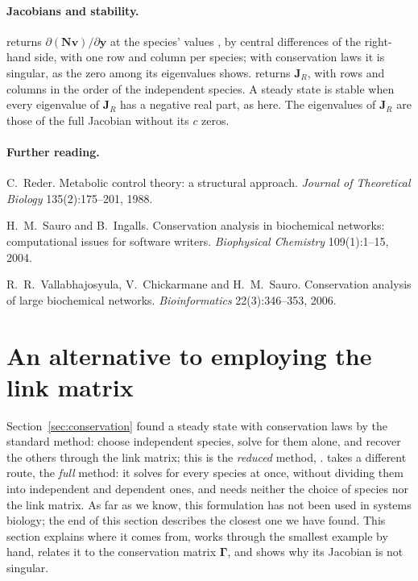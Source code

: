 \documentclass[11pt,a4paper,openany]{report}
\begin{document}
{{\paragraph{Jacobians and stability.} 
returns $\partial (\mathbf{N} \mathbf{v}) / \partial \mathbf{y}$ at the species' values , by
central differences of the right-hand side, with one row and column per
species; with conservation laws it is singular, as the zero among its
eigenvalues shows.  returns $\mathbf{J}_R$,
with rows and columns in the order of the independent species. A steady
state is stable when every eigenvalue of $\mathbf{J}_R$ has a negative real part, as
here. The eigenvalues of $\mathbf{J}_R$ are those of the full Jacobian without its
$c$ zeros.

\paragraph{Further reading.}

\begin{enumerate}[label={[\arabic*]}, ref={\arabic*}, leftmargin=2.2em]
\item\label{ref:reder} C.~Reder. Metabolic control theory: a structural
  approach. \emph{Journal of Theoretical Biology} 135(2):175--201, 1988.
\item\label{ref:sauro} H.~M.~Sauro and B.~Ingalls. Conservation analysis in
  biochemical networks: computational issues for software writers.
  \emph{Biophysical Chemistry} 109(1):1--15, 2004.
\item\label{ref:vallab} R.~R.~Vallabhajosyula, V.~Chickarmane and
  H.~M.~Sauro. Conservation analysis of large biochemical networks.
  \emph{Bioinformatics} 22(3):346--353, 2006.
\end{enumerate}

\section{An alternative to employing the link matrix}\label{sec:full}

Section~\ref{sec:conservation} found a steady state with conservation laws
by the standard method: choose independent species, solve for them alone,
and recover the others through the link matrix; this is the \emph{reduced}
method, .
 takes a different
route, the \emph{full} method: it solves for every species at once, without
dividing them into independent and dependent ones, and needs neither the
choice of species nor the link matrix. As far as we know, this formulation has not
been used in systems biology; the end of this section describes the
closest one we have found. This section explains where it comes from,
works through the smallest example by hand, relates it to the
conservation matrix $\mathbf{\Gamma}$, and shows why its Jacobian is not
singular.

}}
\end{document}
